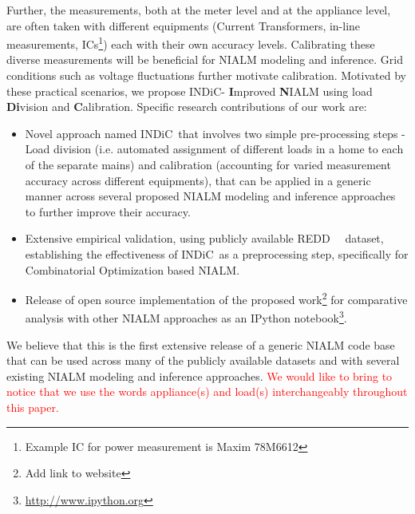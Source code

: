 \documentclass[conference]{IEEEtran}
\newcommand{\redcolor}[1]{\textcolor{red}{#1}}
\newcommand{\indic}{INDiC~}
\newcommand{\indicns}{INDiC}
\begin{document}
\noindent Further, the measurements, both at the meter level and at the appliance level, are often taken with different equipments (Current Transformers, in-line measurements, ICs\footnote{Example IC for power measurement is Maxim 78M6612}) each with their own accuracy levels. Calibrating these diverse measurements will be beneficial for NIALM modeling and inference. Grid conditions such as voltage fluctuations further motivate calibration. Motivated by these practical scenarios, we propose \indicns - \textbf{I}mproved \textbf{N}IALM using load \textbf{Di}vision and \textbf{C}alibration. Specific research contributions of our work are:
\begin{itemize}
\item Novel approach named \indic that involves two simple pre-processing steps - Load division (i.e. automated assignment of different loads in a home to each of the separate mains) and calibration (accounting for varied measurement accuracy across different equipments), that can be applied in a generic manner across several proposed NIALM modeling and inference approaches to further improve their accuracy. 
\item Extensive empirical validation, using publicly available REDD~~\cite{redd} dataset, establishing the effectiveness of \indic as a preprocessing step, specifically for Combinatorial Optimization based NIALM. 
\item Release of open source implementation of the proposed work\footnote{Add link to website} for comparative analysis with other NIALM approaches as an IPython notebook\footnote{\url{http://www.ipython.org}}. 
\end{itemize}
\noindent We believe that this is the first extensive release of a generic NIALM code base that can be used across many of the publicly available datasets and with several existing NIALM modeling and inference approaches. \redcolor{We would like to bring to notice that we use the words appliance(s) and load(s) interchangeably throughout this paper.}
\end{document}
